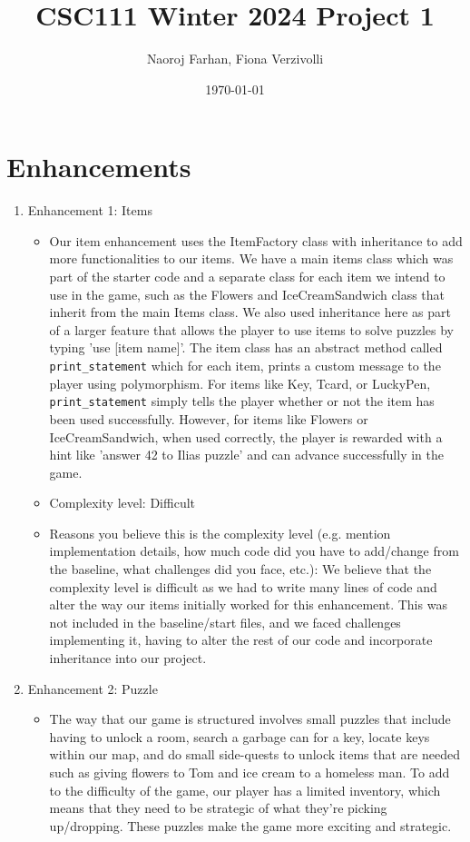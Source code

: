 \documentclass[11pt]{article}
\title{CSC111 Winter 2024 Project 1}
\author{Naoroj Farhan, Fiona Verzivolli}
\date{\today}
\begin{document}
\maketitle

\section*{Enhancements}


\begin{enumerate}

\item Enhancement 1: Items
    \begin{itemize}
    \item Our item enhancement uses the ItemFactory class with inheritance to add more functionalities to our items. We have a main items class which was part of the starter code and a separate class for each item we intend to use in the game, such as the Flowers and IceCreamSandwich class that inherit from the main Items class. We also used inheritance here as part of a larger feature that allows the player to use items to solve puzzles by typing 'use [item name]'. The item class has an abstract method called \texttt{print\_statement} which for each item, prints a custom message to the player using polymorphism. For items like Key, Tcard, or LuckyPen, \texttt{print\_statement} simply tells the player whether or not the item has been used successfully. However, for items like Flowers or IceCreamSandwich, when used correctly, the player is rewarded with a hint like 'answer 42 to Ilias puzzle' and can advance successfully in the game.
 
    \item Complexity level: Difficult
 
    \item Reasons you believe this is the complexity level (e.g. mention implementation details, how much code did you have to add/change from the baseline, what challenges did you face, etc.):
    We believe that the complexity level is difficult as we had to write many lines of code and alter the way our items initially worked for this enhancement. This was not included in the baseline/start files, and we faced challenges implementing it, having to alter the rest of our code and incorporate inheritance into our project.
    \end{itemize}
 

\item Enhancement 2: Puzzle
    \begin{itemize}
    \item The way that our game is structured involves small puzzles that include having to unlock a room, search a garbage can for a key, locate keys within our map, and do small side-quests to unlock items that are needed such as giving flowers to Tom and ice cream to a homeless man. To add to the difficulty of the game, our player has a limited inventory, which means that they need to be strategic of what they're picking up/dropping. These puzzles make the game more exciting and strategic.



\end{itemize}
\end{enumerate}
\end{document}

